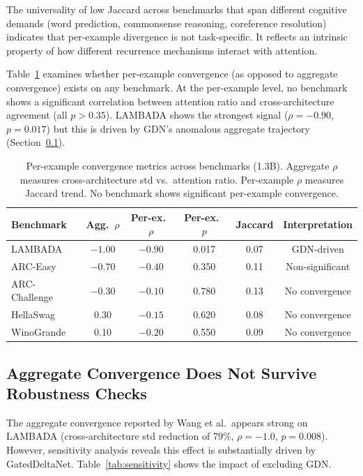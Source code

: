 \documentclass[11pt]{article}
\begin{document}
The universality of low Jaccard across benchmarks that span different cognitive demands (word prediction, commonsense reasoning, coreference resolution) indicates that per-example divergence is not task-specific. It reflects an intrinsic property of how different recurrence mechanisms interact with attention.

Table~\ref{tab:per_example_convergence} examines whether per-example convergence (as opposed to aggregate convergence) exists on any benchmark. At the per-example level, no benchmark shows a significant correlation between attention ratio and cross-architecture agreement (all $p > 0.35$). LAMBADA shows the strongest signal ($\rho = -0.90$, $p = 0.017$) but this is driven by GDN's anomalous aggregate trajectory (Section~\ref{sec:robustness}).

\begin{table}[t]
\centering
\caption{Per-example convergence metrics across benchmarks (1.3B). Aggregate $\rho$ measures cross-architecture std vs.\ attention ratio. Per-example $\rho$ measures Jaccard trend. No benchmark shows significant per-example convergence.}
\label{tab:per_example_convergence}
\begin{tabular}{lccccc}
\toprule
Benchmark & Agg.\ $\rho$ & Per-ex.\ $\rho$ & Per-ex.\ $p$ & Jaccard & Interpretation \\
\midrule
LAMBADA & $-1.00$ & $-0.90$ & 0.017 & 0.07 & GDN-driven \\
ARC-Easy & $-0.70$ & $-0.40$ & 0.350 & 0.11 & Non-significant \\
ARC-Challenge & $-0.30$ & $-0.10$ & 0.780 & 0.13 & No convergence \\
HellaSwag & \phantom{$-$}0.30 & $-0.15$ & 0.620 & 0.08 & No convergence \\
WinoGrande & \phantom{$-$}0.10 & $-0.20$ & 0.550 & 0.09 & No convergence \\
\bottomrule
\end{tabular}
\end{table}

\subsection{Aggregate Convergence Does Not Survive Robustness Checks}
\label{sec:robustness}

The aggregate convergence reported by Wang et al.\ appears strong on LAMBADA (cross-architecture std reduction of 79\%, $\rho = -1.0$, $p = 0.008$). However, sensitivity analysis reveals this effect is substantially driven by GatedDeltaNet. Table~\ref{tab:sensitivity} shows the impact of excluding GDN.
\end{document}

